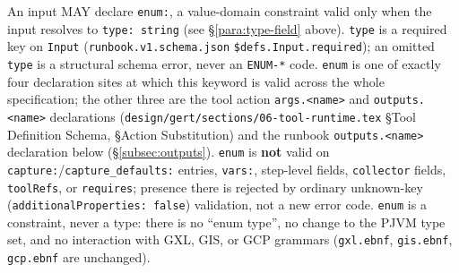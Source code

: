 An input MAY declare \texttt{enum:}, a value-domain constraint valid only
when the input resolves to \texttt{type: string} (see \S\ref{para:type-field}
above). \texttt{type} is a required key on \texttt{Input}
(\texttt{runbook.v1.schema.json} \texttt{\$defs.Input.required}); an omitted
\texttt{type} is a structural schema error, never an \texttt{ENUM-*} code.
\texttt{enum} is one of exactly four
declaration sites at which this keyword is valid across the whole
specification; the other three are the tool action \texttt{args.<name>} and
\texttt{outputs.<name>} declarations
(\texttt{design/gert/sections/06-tool-runtime.tex} \S Tool Definition
Schema, \S Action Substitution) and the runbook \texttt{outputs.<name>}
declaration below (\S\ref{subsec:outputs}). \texttt{enum} is \textbf{not}
valid on \texttt{capture:}/\texttt{capture\_defaults:} entries, \texttt{vars:},
step-level fields, \texttt{collector} fields, \texttt{toolRefs}, or
\texttt{requires}; presence there is rejected by ordinary unknown-key
(\texttt{additionalProperties: false}) validation, not a new error code.
\texttt{enum} is a constraint, never a type: there is no ``enum type'', no
change to the PJVM type set, and no interaction with GXL, GIS, or GCP
grammars (\texttt{gxl.ebnf}, \texttt{gis.ebnf}, \texttt{gcp.ebnf} are
unchanged).

